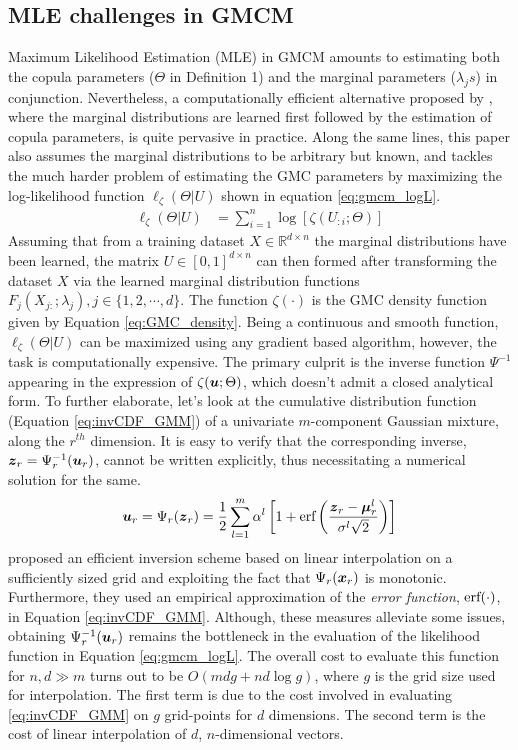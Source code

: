 \documentclass{article}
\theoremstyle{plain}
\theoremstyle{definition}
\theoremstyle{remark}
\begin{document}
\subsection{MLE challenges in GMCM}\label{subsec:MLE_GMCM}
Maximum Likelihood Estimation (MLE) in GMCM amounts to estimating both the copula parameters ($\Theta$ in Definition 1) and the marginal parameters  ($\lambda_js$) in conjunction. Nevertheless, a computationally efficient alternative proposed by \citet{Joe1996IFM}, where the marginal distributions are learned first followed by the estimation of copula parameters, is quite pervasive in practice. Along the same lines, this paper also assumes the marginal distributions to be arbitrary but known, and tackles the much harder problem of estimating the GMC parameters by maximizing the log-likelihood function $\ell_{\zeta}(\Theta|U)$ shown in equation \eqref{eq:gmcm_logL}.
\begin{align} \label{eq:gmcm_logL}
\ell_\zeta(\Theta |U) &= \sum\limits_{i=1}^{n} \log \left[\zeta(U_{:i};\Theta)\right]
\end{align}
Assuming that from a training dataset $X \in \mathbb{R}^{d \times n}$ the marginal distributions have been learned, the matrix $U \in [0 , 1]^{d\times n}$ can then formed after transforming the dataset $X$ via the learned marginal distribution functions $F_j(X_{j:};\lambda_j), j\in\{1,2,\cdots,d\}$. The function $\zeta(\cdot)$ is the GMC density function given by Equation \eqref{eq:GMC_density}. Being a continuous and smooth function, $\ell_\zeta(\Theta |U)$ can be maximized using any gradient based algorithm, however, the task is computationally expensive. The primary culprit is the inverse function $\Psi^{-1}$ appearing in the expression of $\zeta(\boldsymbol{u};\Theta)$, which doesn't admit a closed analytical form. To further elaborate, let's look at the cumulative distribution function (Equation \ref{eq:invCDF_GMM}) of a univariate  $m$-component Gaussian mixture, along the $r^{th}$ dimension.  It is easy to verify that the corresponding inverse, $\boldsymbol{z}_r=\Psi_r^{-1}(\boldsymbol{u}_r)$, cannot be written explicitly, thus necessitating a numerical solution for the same.
\begin{equation} \label{eq:invCDF_GMM}
\boldsymbol{u}_r=\Psi_r(\boldsymbol{z}_r)= \frac{1}{2}\sum\limits_{l=1}^{m} \alpha^l \left[1 + \textmd{erf}\left( \frac{\boldsymbol{z}_r-\boldsymbol{\mu}^l_r}{\sigma^l\sqrt{2}}\right) \right]
\end{equation} 
\citet{Bilgrau2016} proposed an efficient inversion scheme based on linear interpolation on a sufficiently sized grid and exploiting the fact that $\Psi_r(\boldsymbol{x}_r)$ is monotonic. Furthermore, they used an empirical approximation of the \emph{error function}, $\textmd{erf}(\cdot)$, in Equation \ref{eq:invCDF_GMM}. Although, these measures alleviate some issues, obtaining $\Psi_r^{-1}(\boldsymbol{u}_r)$ remains the bottleneck in the evaluation of the likelihood function in Equation \eqref{eq:gmcm_logL}. The overall cost to evaluate this function for $n,d \gg m$ turns out to be $O(mdg + nd\log{g})$, where $g$ is the grid size used for interpolation. The first term is due to the cost involved in evaluating \eqref{eq:invCDF_GMM} on $g$ grid-points for $d$ dimensions. The second term is the cost of linear interpolation of $d$, $n$-dimensional vectors.  
\end{document}
